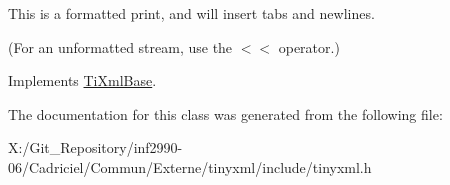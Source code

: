 This is a formatted print, and will insert tabs and newlines.

(For an unformatted stream, use the $<$$<$ operator.) 

Implements \hyperlink{class_ti_xml_base_a0de56b3f2ef14c65091a3b916437b512}{Ti\-Xml\-Base}.



The documentation for this class was generated from the following file\-:\begin{DoxyCompactItemize}
\item 
X\-:/\-Git\-\_\-\-Repository/inf2990-\/06/\-Cadriciel/\-Commun/\-Externe/tinyxml/include/tinyxml.\-h\end{DoxyCompactItemize}
